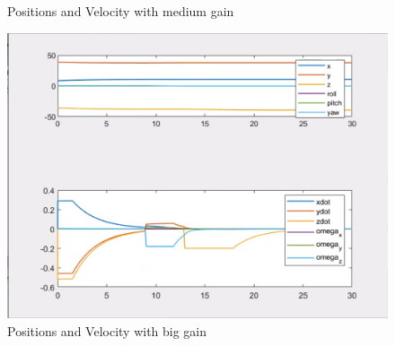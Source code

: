 \documentclass{article}
\begin{document}
\begin{figure}[htpb]
\begin{minipage}{0.40\textwidth}
\caption{Positions and Velocity with medium gain}\label{ppdot_w_m} 
\end{minipage} 
\hspace{0.2\textwidth} 
\begin{minipage}{0.40\textwidth}  
\includegraphics[width=\textwidth]{313_b_ppdot.png}
\caption{Positions and Velocity with big gain}\label{ppdot_w_b} 
\end{minipage}
\end{figure}
\end{document}
